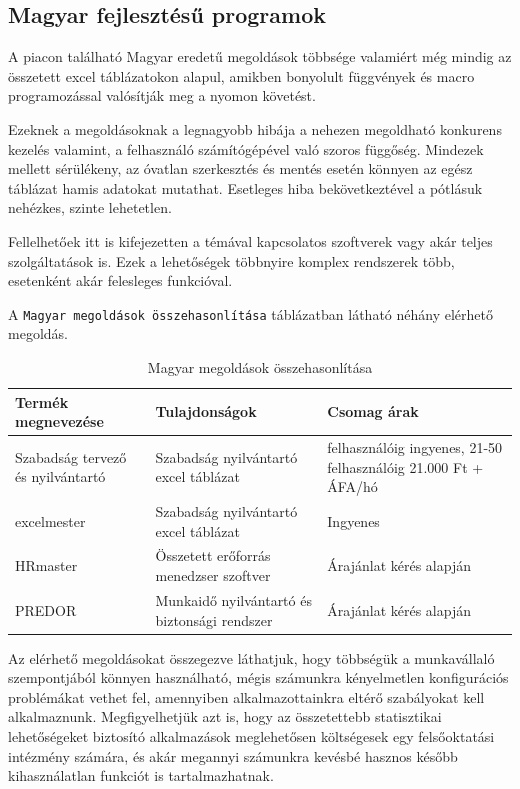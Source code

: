 \subsection{Magyar fejlesztésű programok}

A piacon található Magyar eredetű megoldások többsége valamiért még mindig az összetett excel táblázatokon alapul, amikben bonyolult függvények és macro programozással valósítják meg a nyomon követést.

Ezeknek a megoldásoknak a legnagyobb hibája a nehezen megoldható konkurens kezelés valamint, a felhasználó számítógépével való szoros függőség. Mindezek mellett sérülékeny, az óvatlan szerkesztés és mentés esetén könnyen az egész táblázat hamis adatokat mutathat. Esetleges hiba bekövetkeztével a pótlásuk nehézkes, szinte lehetetlen.

Fellelhetőek itt is kifejezetten a témával kapcsolatos szoftverek vagy akár teljes szolgáltatások is. Ezek a lehetőségek többnyire komplex rendszerek több, esetenként akár felesleges funkcióval.

A  \texttt{Magyar megoldások összehasonlítása} táblázatban látható néhány elérhető megoldás.

\begin{table}[h]
	\centering
	\caption{Magyar megoldások összehasonlítása}
	\label{tab:magyar programok}
	\begin{tabular}{|>{\centering\arraybackslash}m{3cm}|>{\centering\arraybackslash}m{5.5cm}|>{\centering\arraybackslash}m{5.5cm}|}
		\hline
		Termék megnevezése & Tulajdonságok & Csomag árak \\
		\hline
		Szabadság tervező és nyilvántartó\cite{hatekonysagwebsite} & Szabadság nyilvántartó excel táblázat   & 6 felhasználóig ingyenes, 21-50 felhasználóig 21.000 Ft + ÁFA/hó \\
		\hline
		excelmester\cite{excelmestergwebsite} & Szabadság nyilvántartó excel táblázat  & Ingyenes\\
		\hline
		HRmaster\cite{hrmasterwebsite} & Összetett erőforrás menedzser szoftver  & Árajánlat kérés alapján \\
		\hline
		PREDOR\cite{predorwebsite} & Munkaidő nyilvántartó és biztonsági rendszer  & Árajánlat kérés alapján \\
		\hline
	\end{tabular}
\end{table}


Az elérhető megoldásokat összegezve láthatjuk, hogy többségük a munkavállaló szempontjából könnyen használható, mégis számunkra kényelmetlen konfigurációs problémákat vethet fel, amennyiben alkalmazottainkra eltérő szabályokat kell alkalmaznunk. Megfigyelhetjük azt is, hogy az összetettebb statisztikai lehetőségeket biztosító alkalmazások meglehetősen költségesek egy felsőoktatási intézmény számára, és akár megannyi számunkra kevésbé hasznos később kihasználatlan funkciót is tartalmazhatnak.

